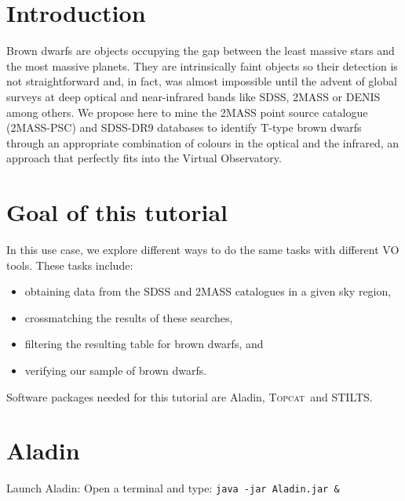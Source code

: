 \documentclass [a4paper, 12pt]{article}
\newcommand{\aladin}{{\textsc{A}{ladin}}}
\newcommand{\topcat}{{\textsc{Topcat}}}
\begin{document}
\newpage

\justify
\section{Introduction}
Brown dwarfs are objects occupying the gap between the least massive
stars and the most massive planets. They are intrinsically faint objects so 
their detection is not straightforward and, in fact, was almost impossible 
until the advent of global surveys at deep optical and near-infrared bands like 
SDSS, 2MASS or DENIS among others. We propose here to mine the 2MASS point 
source catalogue (2MASS-PSC) and 
SDSS-DR9 databases to identify T-type brown dwarfs through an appropriate
combination of colours in the optical and the infrared, an approach that 
perfectly fits into the Virtual
Observatory.

\section{Goal of this tutorial} 
In this use case, we explore different ways to do the same tasks with different 
VO tools. These tasks include:
\begin{itemize}
\item obtaining data from the SDSS and 2MASS catalogues in a given sky region,
\item crossmatching the results of these searches,
\item filtering the resulting table for brown dwarfs, and 
\item verifying our sample of brown dwarfs.
\end{itemize}
\noindent Software packages needed for this tutorial are \aladin, \topcat\ and 
STILTS.

\section{\aladin}
Launch \aladin: Open a terminal and type: \texttt{java -jar Aladin.jar \&} \\
\end{document}
